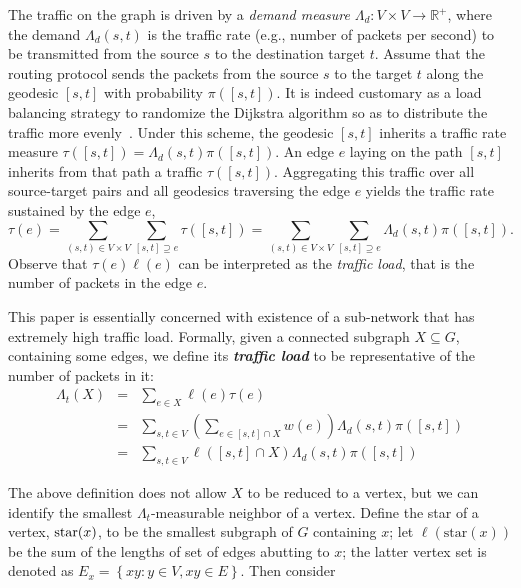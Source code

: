 \documentclass{article}
\begin{document}
The traffic on the graph is driven by a \textit{demand measure }$\Lambda _{d} :V\times V\to \mathbb{R}^{+}$, where the demand $\Lambda _{d} (s,t)$ is the traffic rate (e.g., number of packets per second) to be transmitted from the source $s$ to the destination target $t$. Assume that the routing protocol sends the packets from the source $s$ to the target $t$ along the geodesic $\left[s,t\right]$ with probability $\pi \left(\left[s,t\right]\right)$. It is indeed customary as a load balancing strategy to randomize the Dijkstra algorithm so as to distribute the traffic more evenly~\cite{mingjithesis,Cisco05}. Under this scheme, the geodesic $\left[s,t\right]$ inherits a traffic rate measure $\tau \left(\left[s,t\right]\right)=\Lambda _{d} (s,t)\pi \left(\left[s,t\right]\right)$. An edge $e$ laying on the path $\left[s,t\right]$ inherits from that path a traffic $\tau \left(\left[s,t\right]\right)$. Aggregating this traffic over all source-target pairs and all geodesics traversing the edge $e$ yields the traffic rate sustained by the edge $e$, 
\[\tau (e)=\sum _{(s,t)\in V\times V}\sum _{\left[s,t\right]\supseteq e}\tau \left(\left[s,t\right]\right)=  \sum _{(s,t)\in V\times V}\sum _{\left[s,t\right]\supseteq e}\Lambda _{d} (s,t)\pi \left(\left[s,t\right]\right)  . \] 
\noindent Observe that $\tau (e)\ell (e)$ can be interpreted as the {\it traffic load}, that is the number of packets in the edge $e$. 

This paper is essentially concerned with existence of a sub-network that has extremely high traffic load. Formally, given a connected subgraph $X\subseteq G$, containing some edges, we define its \textit{\textbf{traffic load}} to be representative of the number of packets in it:
\begin{equation}
\label{e:discrete_load}
\begin{array}{rcl} {\Lambda _{t} (X)} & {=} & {\sum _{e\in X}\ell (e)\tau (e) \quad } \\ 
{} & {=} & {\sum _{s,t\in V}\left(\sum _{e\in \left[s,t\right]\cap X}w(e) \right)\Lambda _{d} (s,t)\pi \left(\left[s,t\right]\right) } \\ 
{} & {=} & {\sum _{s,t\in V}\ell \left(\left[s,t\right]\cap X\right)\Lambda _{d} (s,t)\pi \left(\left[s,t\right]\right) } \end{array}
\end{equation} 

The above definition does not allow $X$ to be reduced to a vertex, but we can identify the smallest $\Lambda_t$-measurable neighbor of a vertex. 
Define the star of a vertex, ${\rm star}(x)$, to be the smallest subgraph of $G$ containing $x$;  
let $\ell(\mathrm{star}(x))$ be the sum of the lengths of 
set of edges abutting to $x$; the latter vertex set is denoted as $E_x=\left\{xy:y\in V,xy\in E\right\}$. Then consider
\end{document}
